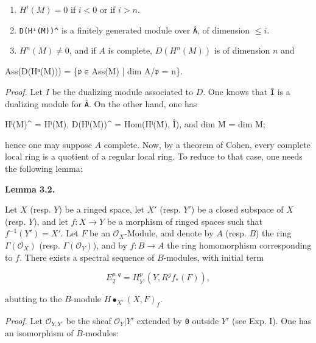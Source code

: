 \documentclass[
  11pt,
  a4paper,
]{book}
\newenvironment{Shaded}{}{}
\newcommand{\NormalTok}[1]{#1}
\begin{document}
\begin{enumerate}
\def\labelenumi{(\roman{enumi})}
\item
  \(H^{i}(M) = 0\) if \(i < 0\) or if \(i > n\).
\item
  \texttt{D(Hⁱ(M))\^{}} is a finitely generated module over \texttt{Â},
  of dimension \(\leqslant i\).
\item
  \(H^{n}(M) \neq 0\), and if \(A\) is complete, \(D(H^{n}(M))\) is of
  dimension \(n\) and
\end{enumerate}

\begin{Shaded}
\begin{Highlighting}[]
\NormalTok{Ass(D(Hⁿ(M))) = \{𝔭 ∈ Ass(M) | dim A/𝔭 = n\}.}
\end{Highlighting}
\end{Shaded}

\emph{Proof.} Let \(I\) be the dualizing module associated to \(D\). One
knows that \texttt{Î} is a dualizing module for \texttt{Â}. On the other
hand, one has

\begin{Shaded}
\begin{Highlighting}[]
\NormalTok{Hⁱ(M)\^{} = Hⁱ(M̂),}
\NormalTok{D(Hⁱ(M))\^{} = Hom(Hⁱ(M̂), Î), and}
\NormalTok{dim M̂ = dim M;}
\end{Highlighting}
\end{Shaded}

hence one may suppose \(A\) complete. Now, by a theorem of Cohen, every
complete local ring is a quotient of a regular local ring. To reduce to
that case, one needs the following lemma:

\textbf{Lemma 3.2.}

Let \(X\) (resp. \(Y\)) be a ringed space, let \(X'\) (resp. \(Y'\)) be
a closed subspace of \(X\) (resp. \(Y\)), and let \(f: X \to
Y\) be a morphism of ringed spaces such that \(f^{-1}(Y') = X'\). Let
\(F\) be an \(\mathcal{O}_{X}\)-Module, and denote by \(A\) (resp.
\(B\)) the ring \(\Gamma(\mathcal{O}_{X})\) (resp.
\(\Gamma(\mathcal{O}_{Y})\)), and by \(f: B \to A\) the ring
homomorphism corresponding to \(f\). There exists a spectral sequence of
\(B\)-modules, with initial term

\[ E^{p,q}_{2} = H^{p}_{Y'}(Y, R^{g}f_{*}(F)), \]

abutting to the \(B\)-module \(H\bullet_{X'}(X, F)_{f}\).

\emph{Proof.} Let \(\mathcal{O}_{Y,Y'}\) be the sheaf
\(\mathcal{O}_{Y}|Y'\) extended by \texttt{0} outside \(Y'\) (see Exp.
I). One has an isomorphism of \(B\)-modules:
\end{document}
